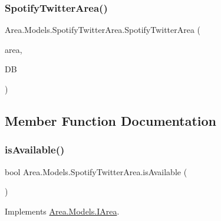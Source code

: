 \subsubsection{\texorpdfstring{Spotify\+Twitter\+Area()}{SpotifyTwitterArea()}}
{\footnotesize\ttfamily Area.\+Models.\+Spotify\+Twitter\+Area.\+Spotify\+Twitter\+Area (\begin{DoxyParamCaption}\item[{\mbox{\hyperlink{classArea_1_1Models_1_1AREA}{A\+R\+EA}}}]{area,  }\item[{\mbox{\hyperlink{classArea_1_1DAT_1_1AreaDbContext}{Area\+Db\+Context}}}]{DB }\end{DoxyParamCaption})\hspace{0.3cm}{\ttfamily [inline]}}



\subsection{Member Function Documentation}
\mbox{\label{classArea_1_1Models_1_1SpotifyTwitterArea_a087443bd0237323d56e02286868b0345}} 
\subsubsection{\texorpdfstring{is\+Available()}{isAvailable()}}
{\footnotesize\ttfamily bool Area.\+Models.\+Spotify\+Twitter\+Area.\+is\+Available (\begin{DoxyParamCaption}{ }\end{DoxyParamCaption})\hspace{0.3cm}{\ttfamily [inline]}}



Implements \mbox{\hyperlink{interfaceArea_1_1Models_1_1IArea_a742b324f0d7573f7f99f9e2adb5df94c}{Area.\+Models.\+I\+Area}}.

\mbox{\label{classArea_1_1Models_1_1SpotifyTwitterArea_ada41191b6c76e9be5677b1e4e175ea23}} 
